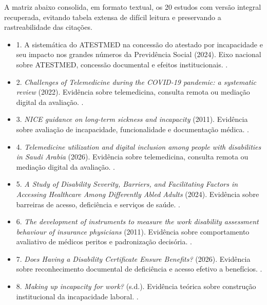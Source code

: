 \documentclass[12pt,a4paper]{article}
\begin{document}
A matriz abaixo consolida, em formato textual, os 20 estudos com versão integral recuperada, evitando tabela extensa de difícil leitura e preservando a rastreabilidade das citações.

\begin{itemize}
\item 1. A sistemática do ATESTMED na concessão do atestado por incapacidade e seu impacto nos grandes números da Previdência Social (2024). Eixo nacional sobre ATESTMED, concessão documental e efeitos institucionais. \parencite{soares20241031t0000000000asistematicadoatestmednaconcessa}.
\item 2. \textit{Challenges of Telemedicine during the COVID-19 pandemic: a systematic review} (2022). Evidência sobre telemedicina, consulta remota ou mediação digital da avaliação. \parencite{ftouni2022challengesoftelemedicineduringthecovid19pandemica}.
\item 3. \textit{NICE guidance on long-term sickness and incapacity} (2011). Evidência sobre avaliação de incapacidade, funcionalidade e documentação médica. \parencite{gabbay2011niceguidanceonlongtermsicknessandincapacity}.
\item 4. \textit{Telemedicine utilization and digital inclusion among people with disabilities in Saudi Arabia} (2026). Evidência sobre telemedicina, consulta remota ou mediação digital da avaliação. \parencite{albasheer2026telemedicineutilizationanddigitalinclusionamongpe}.
\item 5. \textit{A Study of Disability Severity, Barriers, and Facilitating Factors in Accessing Healthcare Among Differently Abled Adults} (2024). Evidência sobre barreiras de acesso, deficiência e serviços de saúde. \parencite{m2024astudyofdisabilityseveritybarriersandfacilitatingfactor}.
\item 6. \textit{The development of instruments to measure the work disability assessment behaviour of insurance physicians} (2011). Evidência sobre comportamento avaliativo de médicos peritos e padronização decisória. \parencite{steenbeek2011thedevelopmentofinstrumentstomeasuretheworkdisa}.
\item 7. \textit{Does Having a Disability Certificate Ensure Benefits?} (2026). Evidência sobre reconhecimento documental de deficiência e acesso efetivo a benefícios. \parencite{rajasulochana2026doeshavingadisabilitycertificateensurebenefit}.
\item 8. \textit{Making up incapacity for work?} (s.d.). Evidência teórica sobre construção institucional da incapacidade laboral. \parencite{dijkstrasdatamakingupincapacityforwork}.

\end{itemize}
\end{document}
